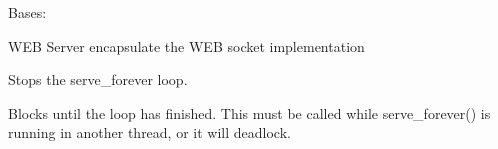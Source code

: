 \documentclass[letterpaper,10pt,english]{sphinxmanual}
\begin{document}
\begin{savenotes}
\begin{fulllineitems}
\begin{savenotes}
\begin{fulllineitems}
\end{fulllineitems}\end{savenotes}


\begin{savenotes}\begin{fulllineitems}
\label{\detokenize{eezz:eezz.server.THttpHandler.shutdown}}
\pysigstartsignatures
{}
\pysigstopsignatures
\end{fulllineitems}\end{savenotes}


\end{fulllineitems}\end{savenotes}


\begin{savenotes}\begin{fulllineitems}
\label{\detokenize{eezz:eezz.server.TWebServer}}
\pysigstartsignatures
{}
\pysigstopsignatures
\sphinxAtStartPar
Bases: 

\sphinxAtStartPar
WEB Server encapsulate the WEB socket implementation

\begin{savenotes}\begin{fulllineitems}
\label{\detokenize{eezz:eezz.server.TWebServer.shutdown}}
\pysigstartsignatures
{}
\pysigstopsignatures
\sphinxAtStartPar
Stops the serve\_forever loop.

\sphinxAtStartPar
Blocks until the loop has finished. This must be called while
serve\_forever() is running in another thread, or it will
deadlock.

\end{fulllineitems}\end{savenotes}


\end{fulllineitems}\end{savenotes}
\end{document}
